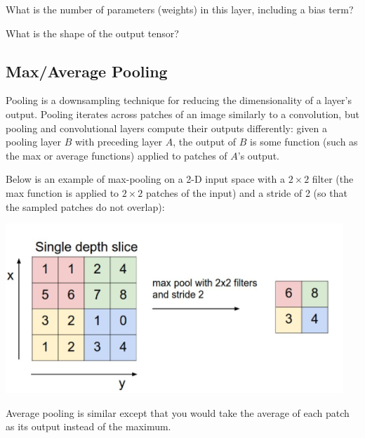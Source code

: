 \problem[2] What is the number of parameters (weights) in this layer, including a bias term?

\begin{subsolution}

\end{subsolution}

\newpage


\problem[3] What is the shape of the output tensor?

\begin{subsolution}

\end{subsolution}

\newpage


 \subsection{Max/Average Pooling}
Pooling is a downsampling technique for reducing the dimensionality of a layer's output. Pooling iterates across patches of an image similarly to a convolution, but pooling and convolutional layers compute their outputs differently: given a pooling layer $B$ with preceding layer $A$, the output of $B$ is some function (such as the max or average functions) applied to patches of $A$'s output.

Below is an example of max-pooling on a 2-D input space with a $2\times 2$ filter (the max function is applied to $2\times 2$ patches of the input) and a stride of 2 (so that the sampled patches do not overlap):

\begin{center}
  \includegraphics[width=.49\textwidth]{../figs/MaxPool.png}
\end{center}

Average pooling is similar except that you would take the average of each patch as its output instead of the maximum.

